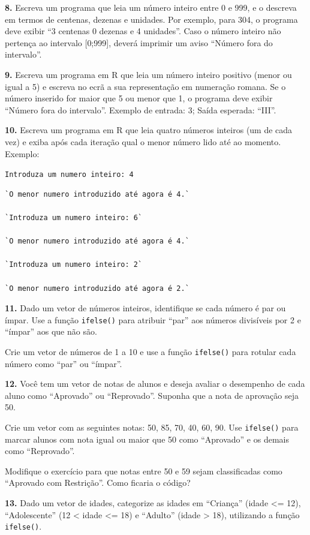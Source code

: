 \documentclass[
]{book}
\begin{document}
\textbf{8.} Escreva um programa que leia um número inteiro entre 0 e 999, e o
descreva em termos de centenas, dezenas e unidades. Por exemplo, para
304, o programa deve exibir ``3 centenas 0 dezenas e 4 unidades''. Caso o
número inteiro não pertença ao intervalo {[}0;999{]}, deverá imprimir um
aviso ``Número fora do intervalo''.

\textbf{9.} Escreva um programa em R que leia um número inteiro positivo
(menor ou igual a 5) e escreva no ecrã a sua representação em numeração
romana. Se o número inserido for maior que 5 ou menor que 1, o programa
deve exibir ``Número fora do intervalo''. Exemplo de entrada: 3; Saída
esperada: ``III''.

\textbf{10.} Escreva um programa em R que leia quatro números inteiros (um de
cada vez) e exiba após cada iteração qual o menor número lido até ao
momento. Exemplo:

\texttt{Introduza\ um\ numero\ inteiro:\ 4}

\begin{verbatim}
`O menor numero introduzido até agora é 4.`

`Introduza um numero inteiro: 6`

`O menor numero introduzido até agora é 4.`

`Introduza um numero inteiro: 2`

`O menor numero introduzido até agora é 2.`
\end{verbatim}

\textbf{11.} Dado um vetor de números inteiros, identifique se cada número é par ou ímpar. Use a função \texttt{ifelse()} para atribuir ``par'' aos números divisíveis por 2 e ``ímpar'' aos que não são.

Crie um vetor de números de 1 a 10 e use a função \texttt{ifelse()} para rotular cada número como ``par'' ou ``ímpar''.

\textbf{12.} Você tem um vetor de notas de alunos e deseja avaliar o desempenho de cada aluno como ``Aprovado'' ou ``Reprovado''. Suponha que a nota de aprovação seja 50.

Crie um vetor com as seguintes notas: 50, 85, 70, 40, 60, 90. Use \texttt{ifelse()} para marcar alunos com nota igual ou maior que 50 como ``Aprovado'' e os demais como ``Reprovado''.

Modifique o exercício para que notas entre 50 e 59 sejam classificadas como ``Aprovado com Restrição''. Como ficaria o código?

\textbf{13.} Dado um vetor de idades, categorize as idades em ``Criança'' (idade \textless= 12), ``Adolescente'' (12 \textless{} idade \textless= 18) e ``Adulto'' (idade \textgreater{} 18), utilizando a função \texttt{ifelse()}.
\end{document}
